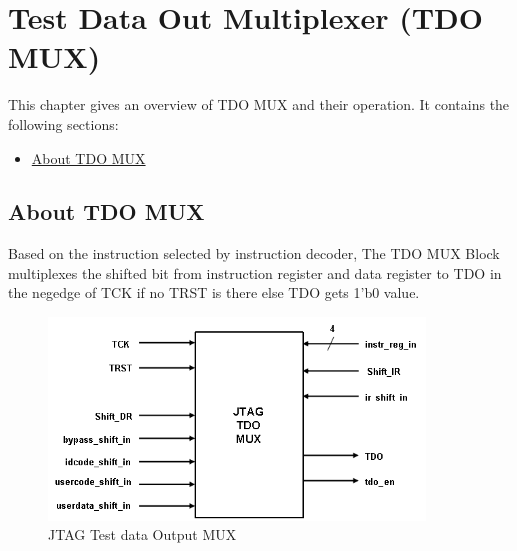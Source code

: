 \chapter{Test Data Out Multiplexer (TDO MUX)}
\label{chap:tdo-mux}

This chapter gives an overview of TDO MUX and their operation. It contains the following sections:
\begin{itemize}
    \item \hyperref[sec:about-tdo-mux]{About TDO MUX}
\end{itemize}

\newpage

\section{About TDO MUX}
\label{sec:about-tdo-mux}
Based on the instruction selected by instruction decoder, The TDO MUX Block multiplexes the shifted bit from instruction register and data register to TDO in the negedge of TCK if no TRST is there else TDO gets 1’b0 value.

\vspace{1cm}
\begin{figure}[H]
    \centering
    \includegraphics[width = 10cm]{images/jtag_tdo_mux.png}
    \vspace{1cm}
    \caption{JTAG Test data Output MUX}
    \label{fig:tdo-mux}
\end{figure}
\vspace{1cm}

